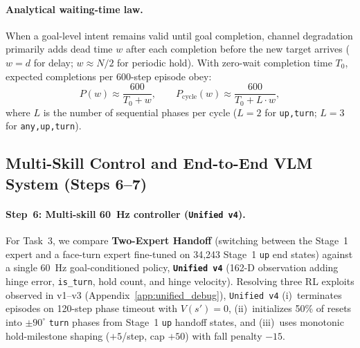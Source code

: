 \paragraph{Analytical waiting-time law.}
When a goal-level intent remains valid until goal completion, channel degradation primarily adds dead time $w$ after each completion before the new target arrives ($w=d$ for delay; $w \approx N/2$ for periodic hold).
With zero-wait completion time $T_0$, expected completions per 600-step episode obey:
\begin{equation}
  P(w) \approx \frac{600}{T_0 + w}, \qquad P_{\mathrm{cycle}}(w) \approx \frac{600}{T_0 + L \cdot w},
  \label{eq:waiting}
\end{equation}
where $L$ is the number of sequential phases per cycle ($L=2$ for \texttt{up,turn}; $L=3$ for \texttt{any,up,turn}).

\subsection{Multi-Skill Control and End-to-End VLM System (Steps 6--7)}
\label{sec:method_unified_vlm}
\paragraph{Step~6: Multi-skill 60~Hz controller (\texttt{Unified v4}).}
For Task~3, we compare \textbf{Two-Expert Handoff} (switching between the Stage~1 expert and a face-turn expert fine-tuned on 34,243 Stage~1 \texttt{up} end states) against a single 60~Hz goal-conditioned policy, \textbf{\texttt{Unified v4}} (162-D observation adding hinge error, \texttt{is\_turn}, hold count, and hinge velocity).
Resolving three RL exploits observed in v1--v3 (Appendix~\ref{app:unified_debug}), \texttt{Unified v4} (i)~terminates episodes on 120-step phase timeout with $V(s')=0$, (ii)~initializes 50\% of resets into $\pm 90^\circ$ \texttt{turn} phases from Stage~1 \texttt{up} handoff states, and (iii)~uses monotonic hold-milestone shaping ($+5$/step, cap $+50$) with fall penalty $-15$.

